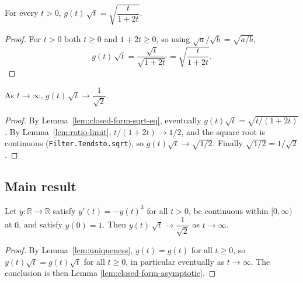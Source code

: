 \begin{lemma}
    \label{lem:closed-form-sqrt-eq}
    \leanok
    For every $t > 0$, $g(t)\,\sqrt t = \sqrt{\dfrac{t}{1+2t}}$.
\end{lemma}
\begin{proof}
    For $t > 0$ both $t \ge 0$ and $1 + 2t \ge 0$, so using
    $\sqrt a/\sqrt b = \sqrt{a/b}$,
    \[
        g(t)\,\sqrt t = \frac{\sqrt t}{\sqrt{1+2t}} = \sqrt{\frac{t}{1+2t}} .
    \]
\end{proof}

\begin{lemma}
    \label{lem:closed-form-asymptotic}
    \leanok
    As $t \to \infty$, $g(t)\,\sqrt{t} \to \dfrac{1}{\sqrt 2}$.
\end{lemma}
\begin{proof}
    By Lemma~\ref{lem:closed-form-sqrt-eq}, eventually $g(t)\sqrt t =
    \sqrt{t/(1+2t)}$. By Lemma~\ref{lem:ratio-limit}, $t/(1+2t) \to 1/2$, and the
    square root is continuous (\texttt{Filter.Tendsto.sqrt}), so
    $g(t)\sqrt t \to \sqrt{1/2}$. Finally $\sqrt{1/2} = 1/\sqrt 2$.
\end{proof}

\subsection{Main result}

\begin{theorem}
    \label{thm:main}
    \leanok
    Let $y : \mathbb{R} \to \mathbb{R}$ satisfy $y'(t) = -y(t)^3$ for all
    $t > 0$, be continuous within $[0,\infty)$ at $0$, and satisfy $y(0) = 1$.
    Then $y(t)\,\sqrt{t} \to \dfrac{1}{\sqrt 2}$ as $t \to \infty$.
\end{theorem}
\begin{proof}
    By Lemma~\ref{lem:uniqueness}, $y(t) = g(t)$ for all $t \ge 0$, so
    $y(t)\sqrt t = g(t)\sqrt t$ for all $t \ge 0$, in particular eventually as
    $t \to \infty$. The conclusion is then Lemma
    \ref{lem:closed-form-asymptotic}.
\end{proof}


